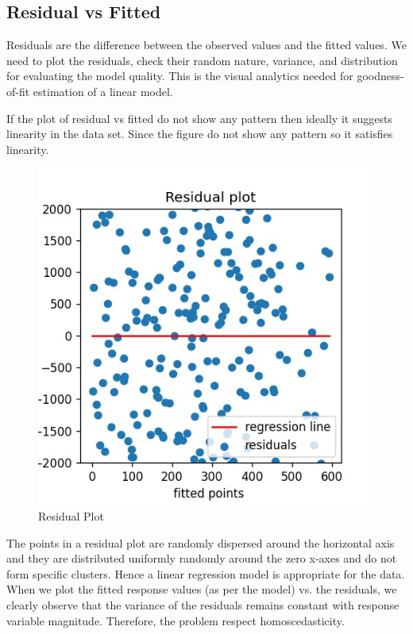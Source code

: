 \documentclass[12pt]{article}
\begin{document}
\pagebreak
\subsection{Residual vs Fitted}
Residuals are the difference between the observed values and the fitted values. We need to plot the residuals, check their random nature, variance, and distribution for evaluating the model quality. This is the visual analytics needed for goodness-of-fit estimation of a linear model.

If the plot of residual vs fitted do not show any pattern then ideally it suggests linearity in the data set. Since the figure do not show any pattern so it satisfies linearity.
\begin{figure}[h]
\centering
\includegraphics[scale=.8]{images/residual-plot.jpg}
\caption{Residual Plot}
\end{figure}


 The points in a residual plot are randomly dispersed around the horizontal axis and they are distributed uniformly randomly around the zero x-axes and do not form specific clusters. Hence a linear regression model is appropriate for the data.\\
 When we plot the fitted response values (as per the model) vs. the residuals, we clearly observe that the variance of the residuals remains constant with response variable magnitude. Therefore, the problem respect homoscedasticity. 
\end{document}
